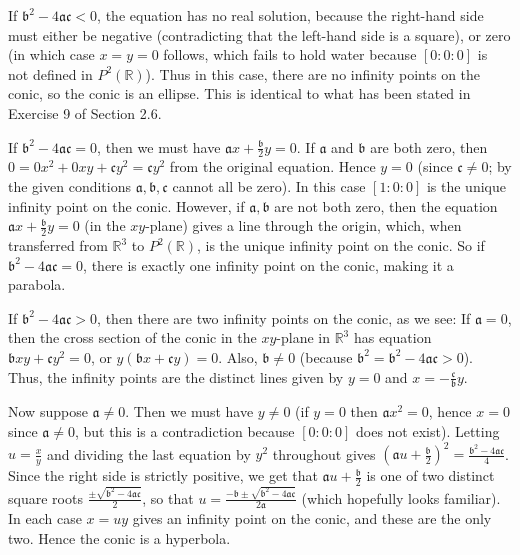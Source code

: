 \documentclass[leqno]{book}
\begin{document}
If $\mathfrak b^2-4\mathfrak a\mathfrak c<0$, the equation has no real solution, because the right-hand side must either be negative (contradicting that the left-hand side is a square), or zero (in which case $x=y=0$ follows, which fails to hold water because $[0:0:0]$ is not defined in $P^2(\mathbb R)$).  Thus in this case, there are no infinity points on the conic, so the conic is an ellipse.  This is identical to what has been stated in Exercise 9 of Section 2.6.

If $\mathfrak b^2-4\mathfrak a\mathfrak c=0$, then we must have $\mathfrak ax+\frac{\mathfrak b}2y=0$.  If $\mathfrak a$ and $\mathfrak b$ are both zero, then $0=0x^2+0xy+\mathfrak cy^2=\mathfrak cy^2$ from the original equation.  Hence $y=0$ (since $\mathfrak c\ne 0$; by the given conditions $\mathfrak a,\mathfrak b,\mathfrak c$ cannot all be zero).  In this case $[1:0:0]$ is the unique infinity point on the conic.  However, if $\mathfrak a,\mathfrak b$ are not both zero, then the equation $\mathfrak ax+\frac{\mathfrak b}2y=0$ (in the $xy$-plane) gives a line through the origin, which, when transferred from $\mathbb R^3$ to $P^2(\mathbb R)$, is the unique infinity point on the conic.  So if $\mathfrak b^2-4\mathfrak a\mathfrak c=0$, there is exactly one infinity point on the conic, making it a parabola.

If $\mathfrak b^2-4\mathfrak a\mathfrak c>0$, then there are two infinity points on the conic, as we see: If $\mathfrak a=0$, then the cross section of the conic in the $xy$-plane in $\mathbb R^3$ has equation $\mathfrak bxy+\mathfrak cy^2=0$, or $y(\mathfrak bx+\mathfrak cy)=0$.  Also, $\mathfrak b\ne 0$ (because $\mathfrak b^2=\mathfrak b^2-4\mathfrak a\mathfrak c>0$).  Thus, the infinity points are the distinct lines given by $y=0$ and $x=-\frac{\mathfrak c}{\mathfrak b}y$.

Now suppose $\mathfrak a\ne 0$.  Then we must have $y\ne 0$ (if $y=0$ then $\mathfrak ax^2=0$, hence $x=0$ since $\mathfrak a\ne 0$, but this is a contradiction because $[0:0:0]$ does not exist).  Letting $u=\frac xy$ and dividing the last equation by $y^2$ throughout gives $\left(\mathfrak au+\frac{\mathfrak b}2\right)^2=\frac{\mathfrak b^2-4\mathfrak a\mathfrak c}4$.  Since the right side is strictly positive, we get that $\mathfrak au+\frac{\mathfrak b}2$ is one of two distinct square roots $\frac{\pm\sqrt{\mathfrak b^2-4\mathfrak a\mathfrak c}}2$, so that $u=\frac{-\mathfrak b\pm\sqrt{\mathfrak b^2-4\mathfrak a\mathfrak c}}{2\mathfrak a}$ (which hopefully looks familiar).  In each case $x=uy$ gives an infinity point on the conic, and these are the only two.  Hence the conic is a hyperbola.
\end{document}
